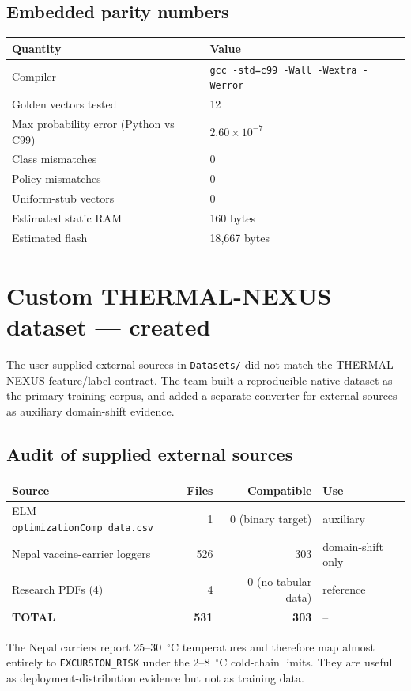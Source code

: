 \documentclass[11pt,a4paper]{article}
\begin{document}
\subsection{Embedded parity numbers}
\begin{center}
\begin{tabular}{ll}
\toprule
\textbf{Quantity} & \textbf{Value} \\
\midrule
Compiler & \texttt{gcc -std=c99 -Wall -Wextra -Werror} \\
Golden vectors tested & 12 \\
Max probability error (Python vs C99) & $2.60 \times 10^{-7}$ \\
Class mismatches & 0 \\
Policy mismatches & 0 \\
Uniform-stub vectors & 0 \\
Estimated static RAM & 160 bytes \\
Estimated flash & 18{,}667 bytes \\
\bottomrule
\end{tabular}
\end{center}

\section{Custom THERMAL-NEXUS dataset --- created}
The user-supplied external sources in \texttt{Datasets/} did not match the
THERMAL-NEXUS feature/label contract. The team built a reproducible native
dataset as the primary training corpus, and added a separate converter for
external sources as auxiliary domain-shift evidence.

\subsection{Audit of supplied external sources}
\begin{center}
\begin{tabular}{lrrl}
\toprule
\textbf{Source} & \textbf{Files} & \textbf{Compatible} & \textbf{Use} \\
\midrule
ELM \texttt{optimizationComp\_data.csv} & 1 & 0 (binary target) & auxiliary \\
Nepal vaccine-carrier loggers & 526 & 303 & domain-shift only \\
Research PDFs (4) & 4 & 0 (no tabular data) & reference \\
\textbf{TOTAL} & \textbf{531} & \textbf{303} & -- \\
\bottomrule
\end{tabular}
\end{center}
The Nepal carriers report 25--30~$^{\circ}$C temperatures and therefore map
almost entirely to \texttt{EXCURSION\_RISK} under the 2--8~$^{\circ}$C
cold-chain limits. They are useful as deployment-distribution evidence but
not as training data.
\end{document}
